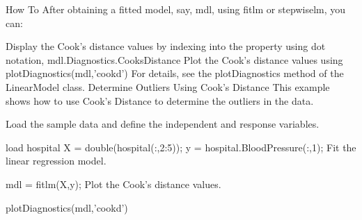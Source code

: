 How To
After obtaining a fitted model, say, mdl, using fitlm or stepwiselm, you can:

Display the Cook's distance values by indexing into the property using dot notation,
mdl.Diagnostics.CooksDistance
Plot the Cook's distance values using
plotDiagnostics(mdl,'cookd')
For details, see the plotDiagnostics method of the LinearModel class.
Determine Outliers Using Cook's Distance
This example shows how to use Cook's Distance to determine the outliers in the data.

Load the sample data and define the independent and response variables.

load hospital
X = double(hospital(:,2:5));
y = hospital.BloodPressure(:,1);
Fit the linear regression model.

mdl = fitlm(X,y);
Plot the Cook's distance values.

plotDiagnostics(mdl,'cookd')
